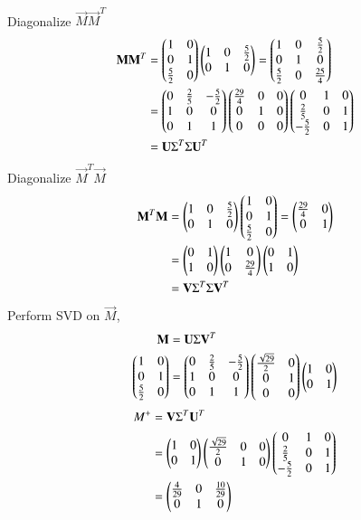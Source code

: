 \documentclass[journal,12pt,twocolumn]{IEEEtran}
\begin{document}
\\
Diagonalize $\vec{M}\vec{M}^T$
\begin{align}
	\label{eq12}\mathbf{M}\mathbf{M}^T &= \begin{pmatrix}1 & 0\\0 & 1\\\frac{5}{2} & 0\end{pmatrix}\begin{pmatrix}1 & 0 & \frac{5}{2}\\0 & 1 & 0\end{pmatrix} = \begin{pmatrix}1 & 0 & \frac{5}{2}\\0 & 1 & 0\\\frac{5}{2} & 0 & \frac{25}{4}\end{pmatrix}\\
	\label{eq13}&= \begin{pmatrix}0 & \frac{2}{5} & -\frac{5}{2}\\1 & 0 & 0\\0 & 1 & 1\end{pmatrix}\begin{pmatrix}\frac{29}{4} & 0 & 0\\0 & 1 & 0\\0 & 0 & 0\end{pmatrix}\begin{pmatrix}0 & 1 & 0\\\frac{2}{5} & 0 & 1\\-\frac{5}{2} & 0 & 1\end{pmatrix}\\
	&= \mathbf{U}\Sigma^T\Sigma\mathbf{U}^T
\end{align}
Diagonalize $\vec{M}^T\vec{M}$
\begin{align}
	\label{e14}\mathbf{M}^T\mathbf{M} &= \begin{pmatrix}1 & 0 & \frac{5}{2}\\0 & 1 & 0\end{pmatrix}\begin{pmatrix}1 & 0\\0 & 1\\\frac{5}{2} & 0\end{pmatrix} = \begin{pmatrix}\frac{29}{4} & 0\\0 & 1\end{pmatrix}\\
	\label{eq15}&= \begin{pmatrix}0 & 1\\1 & 0\end{pmatrix}\begin{pmatrix}1 & 0\\0 & \frac{29}{4}\end{pmatrix}\begin{pmatrix}0 & 1\\1 & 0\end{pmatrix}\\
	&= \mathbf{V}\Sigma^T\Sigma\mathbf{V}^T
\end{align}
Perform SVD on $\vec{M}$,
\begin{align}
	\label{eq16}\mathbf{M} &= \mathbf{U}\Sigma\mathbf{V}^T\\
	\label{eq17}\begin{pmatrix}1 & 0\\0 & 1\\\frac{5}{2} & 0\end{pmatrix} &= \begin{pmatrix}0 & \frac{2}{5} & -\frac{5}{2}\\1 & 0 & 0\\0 & 1 & 1\end{pmatrix}\begin{pmatrix}\frac{\sqrt{29}}{2} & 0 \\0 & 1\\0 & 0\end{pmatrix} \begin{pmatrix}1 & 0\\0 & 1\end{pmatrix}
\end{align}
\begin{align}
	\label{eq18}M^{+} &= \mathbf{V}\Sigma^T\mathbf{U}^T\\
	\label{eq19}&= \begin{pmatrix}1 & 0\\0 & 1\end{pmatrix}\begin{pmatrix}\frac{\sqrt{29}}{2} & 0 & 0\\0 & 1 & 0\end{pmatrix}\begin{pmatrix}0 & 1 & 0\\\frac{2}{5} & 0 & 1\\-\frac{5}{2} & 0 & 1\end{pmatrix}\\
	\label{eq20}&=\begin{pmatrix}\frac{4}{29} & 0 & \frac{10}{29}\\0 & 1 & 0\end{pmatrix}
\end{align}
\end{document}

